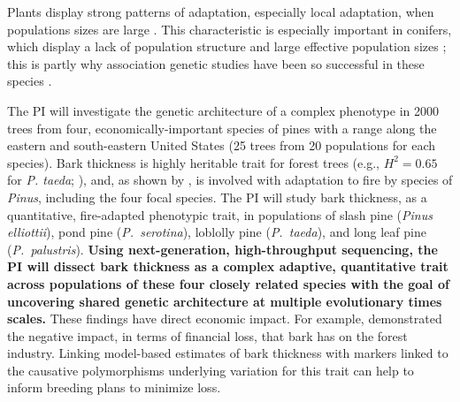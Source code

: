 Plants display strong patterns of adaptation, especially local adaptation, when populations sizes are large \citep{Leimu:2008fb}.
This characteristic is especially important in conifers, which display a lack of population structure and large effective population 
sizes \citep{Neale:2004hi}; this is partly why association genetic studies have been so successful in these species 
\citep{Gupta:2005fx,GonzalezMartinez:2006ij,GonzalezMartinez:2007gy, Eckert:2009hh, Wegrzyn:2010dd, Eckert:2010hd,Eckert:2012cw}.

The PI will investigate the genetic architecture of a complex phenotype in 2000 trees from four, economically-important 
species of pines with a range along the eastern and south-eastern United States (25 trees from 20 populations for each species).
Bark thickness is highly heritable trait for forest trees (e.g., $H^2 = 0.65$ for \emph{P. taeda}; \citet{Pederick1970}), and, as shown by 
\citet{He:2012bz}, is involved with adaptation to fire by species of \emph{Pinus}, including the four focal species.
The PI will study bark thickness, as a quantitative, fire-adapted phenotypic trait, in populations of slash 
pine (\emph{Pinus elliottii}), pond pine (\emph{P.\ serotina}), loblolly pine (\emph{P.\ taeda}), and long leaf pine 
(\emph{P.\ palustris}).  \textbf{Using next-generation, high-throughput sequencing, the PI will dissect bark thickness as a complex 
adaptive, quantitative trait across populations of these four closely related species with the goal of uncovering shared genetic 
architecture at multiple evolutionary times scales.}  These findings have direct economic impact.  For example, \citet{Marshall:2006wl} 
demonstrated the negative impact, in terms of financial loss, that bark has on the forest industry.  Linking model-based 
estimates of bark thickness with markers linked to the causative polymorphisms underlying variation for this trait can help to 
inform breeding plans to minimize loss.

